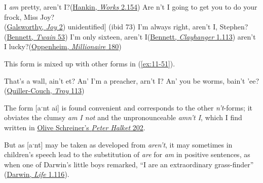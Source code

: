 \ex
I \emph{am} pretty, aren't I?\hfill(\href{https://archive.org/details/dramaticworksofs02hank/page/154/mode/2up?q=%22aren%27t+I%22&view=theater}{Hankin, \textit{Works} 2.154}) %
\ex
Are n't I going to get you to do your frock, Miss Joy?\\\hfill(\href{https://archive.org/details/joyplayonletteri00gals/page/130/mode/2up?q=%22going+to+get+you+to%22&view=theater}{Galsworthy, \textit{Joy} 2}) %
\ex {[}unidentified{]} 
\hfill(ibid 73) %
\ex
I'm always right, aren't I, Stephen?\hfill(\href{https://archive.org/details/thesetwain0000arno_p9h0/page/50/mode/2up?q=%22always+right%22&view=theater}{Bennett, \textit{Twain} 53}) %
\ex
I'm only sixteen, aren't I\hfill(\href{https://archive.org/details/clayhanger01benngoog/page/94/mode/2up?q=%22aren%27t+I%22&view=theater}{Bennett, \textit{Clayhanger} 1.113}) %
\ex
aren't I lucky?\hfill(\href{https://www.gutenberg.org/cache/epub/1878/pg1878-images.html#link2HCH0030}{Oppenheim, \textit{Millionaire} 180}) %
\z
\z

This form is mixed up with other forms in (\ref{ex:11-51}).

\ea \label{ex:11-51}
That's a wall, ain't et? An' I'm a preacher, arn't I? An' you be worms, bain't 'ee?\hfill(\href{https://archive.org/details/astonishinghisto0000quil_t3y6/page/112/mode/2up?q=%22that%27s+a+wall%22&view=theater}{Quiller-Couch, \textit{Troy} 113})
\z

The form [aˑnt ai] is found convenient and corresponds to the other \textit{n't}-forms; it obviates the clumsy \textit{am I not} and the unpronounceable \textit{amn't I}, which I find written in \href{https://archive.org/details/trooperpeterhalk00schriala/page/100/mode/2up?q=%22am+n%27t%22&view=theater}{Olive Schreiner's \textit{Peter Halket} 202}.

But as [aˑnt] may be taken as developed from \textit{aren't}, it may sometimes in children's speech lead to the substitution of \textit{are} for \textit{am} in positive sentences, as when one of Darwin's little boys remarked, ``I are an extraordinary grass-finder'' (\href{https://www.darwinproject.ac.uk/people/about-darwin/family-life/darwin-s-observations-his-children}{\mbox{Darwin}, \textit{Life} 1.116}).

